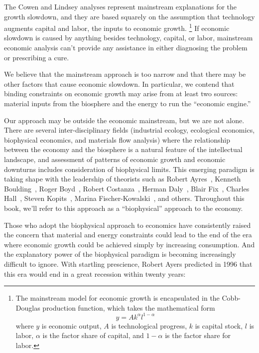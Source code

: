 The Cowen and Lindsey analyses represent mainstream explanations for the growth slowdown,
and they are based squarely on the assumption that technology augments 
capital and labor, the inputs to economic growth.%
	\footnote{
	The mainstream model for economic growth is encapsulated in the
	Cobb-Douglas production function, which takes the mathematical form
	\begin{equation*}
		y = A k^{\alpha} l^{1-\alpha}
	\end{equation*}	 
	where 
	$y$ is economic output, 
	$A$ is technological progress,
	$k$ is capital stock, 
	$l$ is labor, 
	$\alpha$ is the factor share of capital, and
	$1-\alpha$ is the factor share for labor.
	}
If economic slowdown is caused by anything besides
technology, capital, or labor,
mainstream economic analysis can't provide any assistance
in either diagnosing the problem or prescribing a cure.

We believe that the mainstream approach is too narrow and
that there may be other factors that cause economic slowdown.
In particular,  
we contend that binding constraints on economic growth may arise from
at least two sources: 
material inputs from the biosphere and 
the energy to run the ``economic engine.''

Our approach may be outside the economic mainstream,
but we are not alone. 
There are several inter-disciplinary fields 
(industrial ecology, ecological economics, biophysical economics, and
materials flow analysis)
where the relationship between the 
economy and the biosphere is a natural feature of the intellectual landscape,
and assessment of patterns of economic growth and economic downturns  
includes consideration of biophysical limits. 
This emerging paradigm is taking shape with the leadership of theorists
such as 
Robert Ayres~\cite{Ayres:2010ug}, 
Kenneth Boulding~\cite{Boulding1966}, 
Roger Boyd~\cite{boyd2013energy},
Robert Costanza~\cite{Cleveland:1984aa}, 
Herman Daly~\cite{Daly1977}, 
Blair Fix~\cite{Fix:2014aa},
Charles Hall~\cite{hall2011energy}, 
Steven Kopits~\cite{Kopits:2009aa},
Marina Fischer-Kowalski~\cite{F-K1999},
and others.
Throughout this book, we'll refer to this approach as a ``biophysical'' approach
to the economy.

Those who adopt the biophysical approach to economics
have consistently raised the concern 
that material and energy constraints could lead to the 
end of the era where economic growth could be
achieved simply by increasing
consumption. And the explanatory power
of the biophysical paradigm is becoming 
increasingly difficult to ignore.
With startling prescience, Robert Ayers predicted in 1996
that this era would end in a great recession within twenty years:

